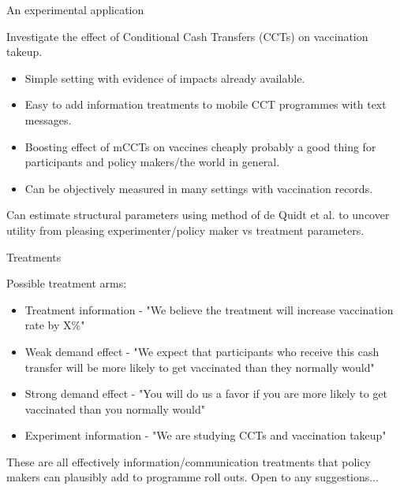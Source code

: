 \documentclass[aspectratio=169,xcolor=dvipsnames]{beamer}
\begin{document}
\begin{frame}{An experimental application}

    Investigate the effect of Conditional Cash Transfers (CCTs) on vaccination takeup.

    \begin{itemize}
        \item Simple setting with evidence of impacts already available.
        \item Easy to add information treatments to mobile CCT programmes with text messages.
        \item Boosting effect of mCCTs on vaccines cheaply probably a good thing for participants and policy makers/the 
        world in general.
        \item Can be objectively measured in many settings with vaccination records.
    \end{itemize}



    Can estimate structural parameters using method of de Quidt et al. to 
    uncover utility from pleasing experimenter/policy maker vs treatment parameters.
    

\end{frame}

\begin{frame}{Treatments}


    Possible treatment arms:

    \begin{itemize}
        \item Treatment information - "We believe the treatment will increase vaccination rate by X\%"
        \item Weak demand effect - "We expect that participants who receive this cash transfer will 
        be more likely to get vaccinated  than they normally would"
        \item Strong demand effect - "You will do us a favor if you are more likely to get vaccinated than you normally would" 
        \item Experiment information - "We are studying CCTs and vaccination takeup"
    \end{itemize}
    
    These are all effectively information/communication treatments that policy makers 
    can plausibly add to programme roll outs.
   \vfill 
    Open to any suggestions...

\end{frame}
\end{document}
